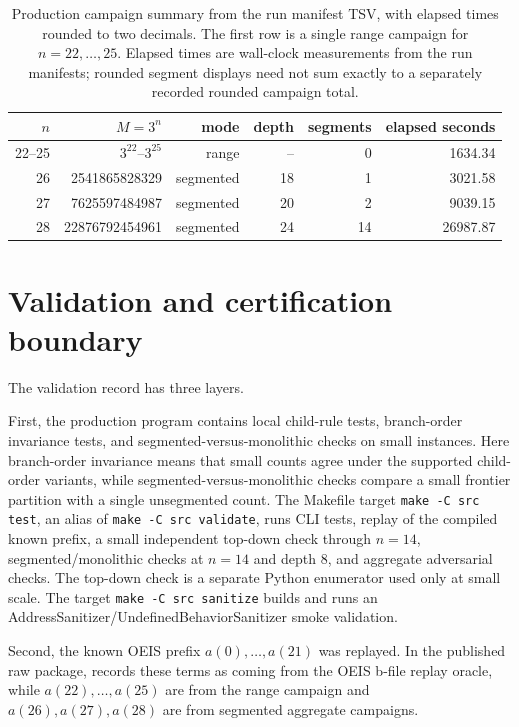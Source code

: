 \documentclass[11pt]{article}
\theoremstyle{definition}
\theoremstyle{remark}
\begin{document}
\begin{table}[ht]
\centering
\begin{tabular}{rrrrrr}
\toprule
\(n\) & \(M=3^n\) & mode & depth & segments & elapsed seconds \\
\midrule
22--25 & \(3^{22}\)--\(3^{25}\) & range & -- & 0 & 1634.34 \\
26 & 2541865828329 & segmented & 18 & 1 & 3021.58 \\
27 & 7625597484987 & segmented & 20 & 2 & 9039.15 \\
28 & 22876792454961 & segmented & 24 & 14 & 26987.87 \\
\bottomrule
\end{tabular}
\caption{Production campaign summary from the run manifest TSV, with elapsed
times rounded to two decimals.  The first row is a single range campaign for
\(n=22,\ldots,25\).  Elapsed times are wall-clock measurements from the run
manifests; rounded segment displays need not sum exactly to a separately
recorded rounded campaign total.}
\label{tab:campaign-summary}
\end{table}

\section{Validation and certification boundary}

The validation record has three layers.

First, the production program contains local child-rule tests, branch-order
invariance tests, and segmented-versus-monolithic checks on small instances.
Here branch-order invariance means that small counts agree under the supported
child-order variants, while segmented-versus-monolithic checks compare a small
frontier partition with a single unsegmented count.  The Makefile target
\texttt{make -C src test}, an alias of \texttt{make -C src validate}, runs CLI
tests, replay of the compiled known prefix, a small independent top-down check
through \(n=14\), segmented/monolithic checks at \(n=14\) and depth \(8\), and
aggregate adversarial checks.  The top-down check is a separate Python
enumerator used only at small scale.  The target \texttt{make -C src sanitize}
builds and runs an
AddressSanitizer/UndefinedBehaviorSanitizer smoke validation.

Second, the known OEIS prefix \(a(0),\ldots,a(21)\) was replayed.  In the
published raw package,  records these terms as
coming from the OEIS b-file replay oracle, while \(a(22),\ldots,a(25)\) are
from the range campaign and \(a(26),a(27),a(28)\) are from segmented aggregate
campaigns.
\end{document}
